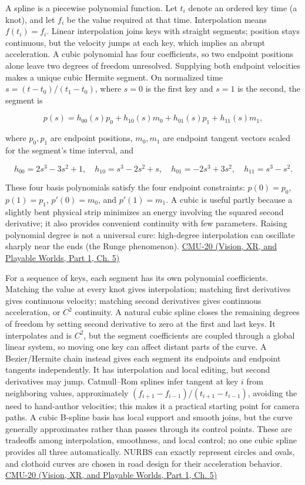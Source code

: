 A spline is a piecewise polynomial function. Let \(t_i\) denote an ordered key time (a knot), and let \(f_i\) be the value required at that time. Interpolation means \(f(t_i)=f_i\). Linear interpolation joins keys with straight segments; position stays continuous, but the velocity jumps at each key, which implies an abrupt acceleration. A cubic polynomial has four coefficients, so two endpoint positions alone leave two degrees of freedom unresolved. Supplying both endpoint velocities makes a unique cubic Hermite segment. On normalized time \(s=(t-t_0)/(t_1-t_0)\), where \(s=0\) is the first key and \(s=1\) is the second, the segment is

\[
p(s)=h_{00}(s)p_0+h_{10}(s)m_0+h_{01}(s)p_1+h_{11}(s)m_1,
\]

where \(p_0,p_1\) are endpoint positions, \(m_0,m_1\) are endpoint tangent vectors scaled for the segment's time interval, and

\[
h_{00}=2s^3-3s^2+1,\quad h_{10}=s^3-2s^2+s,\quad h_{01}=-2s^3+3s^2,\quad h_{11}=s^3-s^2.
\]

These four basis polynomials satisfy the four endpoint constraints: \(p(0)=p_0\), \(p(1)=p_1\), \(p'(0)=m_0\), and \(p'(1)=m_1\). A cubic is useful partly because a slightly bent physical strip minimizes an energy involving the squared second derivative; it also provides convenient continuity with few parameters. Raising polynomial degree is not a universal cure: high-degree interpolation can oscillate sharply near the ends (the Runge phenomenon). \href{../07-Vision-XR-and-Playable-Worlds-P01/main.pdf\#nameddest=04-visual-computing-ii-ch036-cmu-20---introduction-to-animation}{CMU-20 (Vision, XR, and Playable Worlds, Part 1, Ch. 5)}

For a sequence of keys, each segment has its own polynomial coefficients. Matching the value at every knot gives interpolation; matching first derivatives gives continuous velocity; matching second derivatives gives continuous acceleration, or \(C^2\) continuity. A natural cubic spline closes the remaining degrees of freedom by setting second derivative to zero at the first and last keys. It interpolates and is \(C^2\), but the segment coefficients are coupled through a global linear system, so moving one key can affect distant parts of the curve. A Bezier/Hermite chain instead gives each segment its endpoints and endpoint tangents independently. It has interpolation and local editing, but second derivatives may jump. Catmull--Rom splines infer tangent at key \(i\) from neighboring values, approximately \((f_{i+1}-f_{i-1})/(t_{i+1}-t_{i-1})\), avoiding the need to hand-author velocities; this makes it a practical starting point for camera paths. A cubic B-spline basis has local support and smooth joins, but the curve generally approximates rather than passes through its control points. These are tradeoffs among interpolation, smoothness, and local control; no one cubic spline provides all three automatically. NURBS can exactly represent circles and ovals, and clothoid curves are chosen in road design for their acceleration behavior. \href{../07-Vision-XR-and-Playable-Worlds-P01/main.pdf\#nameddest=04-visual-computing-ii-ch036-cmu-20---introduction-to-animation}{CMU-20 (Vision, XR, and Playable Worlds, Part 1, Ch. 5)}

